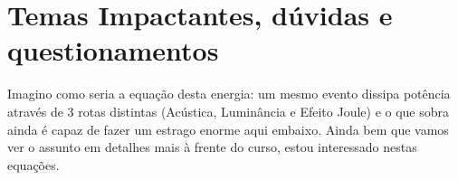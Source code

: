 \documentclass[a4paper, 12pt, onecolumn,singlespacing]{article}
\begin{document}
	\section{Temas Impactantes, dúvidas e questionamentos}
	
	Imagino como seria a equação desta energia: um mesmo evento dissipa potência através de 3 rotas distintas (Acústica, Luminância e Efeito Joule) e o que sobra ainda é capaz de fazer um estrago enorme aqui embaixo. Ainda bem que vamos ver o assunto em detalhes mais à frente do curso, estou interessado nestas equações.
	
\end{document}
